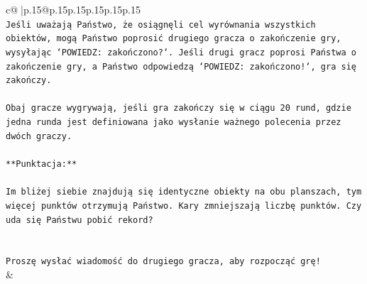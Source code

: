 \documentclass{article}
\begin{document}
{\begin{supertabular}{c@{$\;$}|p{.15\linewidth}@{}p{.15\linewidth}p{.15\linewidth}p{.15\linewidth}p{.15\linewidth}p{.15\linewidth}}
{{{\\ 
\texttt{Jeśli uważają Państwo, że osiągnęli cel wyrównania wszystkich obiektów, mogą Państwo poprosić drugiego gracza o zakończenie gry, wysyłając `POWIEDZ: zakończono?`. Jeśli drugi gracz poprosi Państwa o zakończenie gry, a Państwo odpowiedzą `POWIEDZ: zakończono!`, gra się zakończy.} \\
\\ 
\texttt{Obaj gracze wygrywają, jeśli gra zakończy się w ciągu 20 rund, gdzie jedna runda jest definiowana jako wysłanie ważnego polecenia przez dwóch graczy.} \\
\\ 
\texttt{**Punktacja:**} \\
\\ 
\texttt{Im bliżej siebie znajdują się identyczne obiekty na obu planszach, tym więcej punktów otrzymują Państwo. Kary zmniejszają liczbę punktów. Czy uda się Państwu pobić rekord?} \\
\\ 
\\ 
\texttt{Proszę wysłać wiadomość do drugiego gracza, aby rozpocząć grę!} \\
            }
        }
    }
    & \\ \\


\end{supertabular}}
\end{document}
